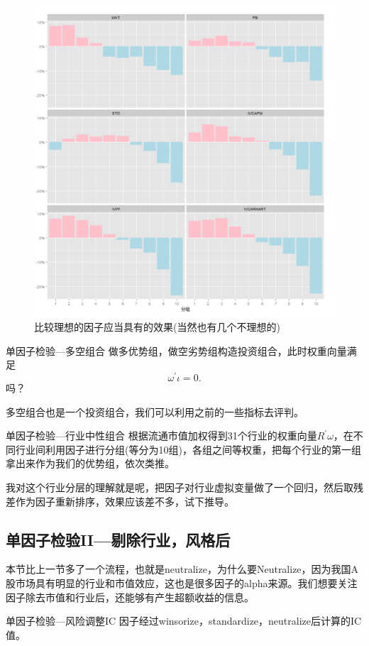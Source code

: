 \documentclass[12pt]{article}
\begin{document}
\begin{figure}[htb]
\centering
\includegraphics[scale=0.7]{figure/因子单调性.jpg}
\caption{比较理想的因子应当具有的效果(当然也有几个不理想的)}
\end{figure}

\begin{sdefinition}{单因子检验—多空组合}{}
做多优势组，做空劣势组构造投资组合，此时权重向量满足
$$
\omega^\prime \iota = 0.
$$
吗？
\end{sdefinition}
多空组合也是一个投资组合，我们可以利用之前的一些指标去评判。

\begin{sdefinition}{单因子检验—行业中性组合}{}
根据流通市值加权得到31个行业的权重向量$R^\prime \omega$，在不同行业间利用因子进行分组(等分为10组)，各组之间等权重，把每个行业的第一组拿出来作为我们的优势组，依次类推。
\end{sdefinition}
\begin{sremark}{}{}
我对这个行业分层的理解就是呢，把因子对行业虚拟变量做了一个回归，然后取残差作为因子重新排序，效果应该差不多，试下推导。
\end{sremark}

\subsection{单因子检验II—剔除行业，风格后}
本节比上一节多了一个流程，也就是neutralize，为什么要Neutralize，因为我国A股市场具有明显的行业和市值效应，这也是很多因子的alpha来源。我们想要关注因子除去市值和行业后，还能够有产生超额收益的信息。
\begin{sdefinition}{单因子检验—风险调整IC}{}
	因子经过winsorize，standardize，neutralize后计算的IC值。
\end{sdefinition}
\end{document}
